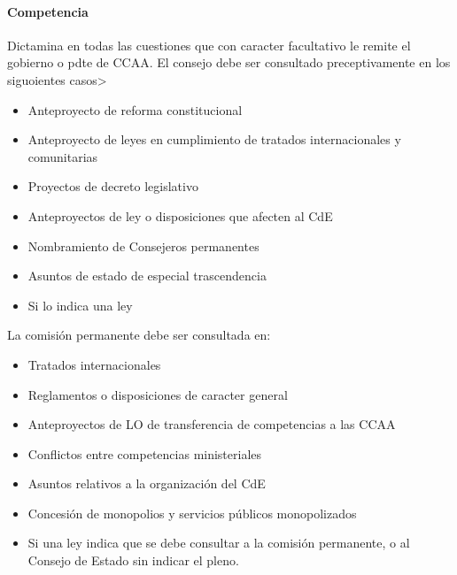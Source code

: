         \paragraph{Competencia}
            Dictamina en todas las cuestiones que  con caracter facultativo le remite el gobierno o pdte de CCAA.
            El consejo debe ser consultado preceptivamente en los siguoientes casos>
            \begin{itemize}
                \item Anteproyecto de reforma constitucional
                \item Anteproyecto de leyes en cumplimiento de tratados internacionales y comunitarias
                \item Proyectos de decreto legislativo
                \item Anteproyectos de ley o disposiciones que afecten al CdE
                \item Nombramiento de Consejeros permanentes
                \item Asuntos de estado de especial trascendencia
                \item Si lo indica una ley
            \end{itemize}
            La comisión permanente debe ser consultada en:
            \begin{itemize}
                \item Tratados internacionales
                \item Reglamentos o disposiciones de caracter general
                \item Anteproyectos de LO de transferencia de competencias a las CCAA
                \item Conflictos entre competencias ministeriales
                \item Asuntos relativos a la organización del CdE
                \item Concesión de monopolios y servicios públicos monopolizados
                \item Si una ley indica que se debe consultar a la comisión permanente, o al Consejo de Estado sin indicar el pleno.
            \end{itemize}


